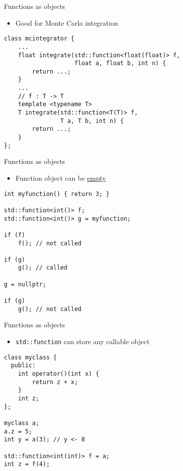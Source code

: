 \documentclass[10pt]{beamer}
\begin{document}
\begin{frame}[fragile,label={sec:orgdacb95a}]{Functions as objects}
 \begin{itemize}
\item Good for Monte Carlo integration
\end{itemize}

\begin{verbatim}
class mcintegrator {
    ...
    float integrate(std::function<float(float)> f,
                    float a, float b, int n) {
        return ...;
    }
    ...
    // f : T -> T
    template <typename T>
    T integrate(std::function<T(T)> f,
                T a, T b, int n) {
        return ...;
    }
};
\end{verbatim}
\end{frame}

\begin{frame}[fragile,label={sec:orgcf9fad0}]{Functions as objects}
 \begin{itemize}
\item Function object can be \uline{empty}
\end{itemize}

\begin{verbatim}
int myfunction() { return 3; }

std::function<int()> f;
std::function<int()> g = myfunction;

if (f)
    f(); // not called

if (g)
    g(); // called

g = nullptr;

if (g)
    g(); // not called
\end{verbatim}
\end{frame}

\begin{frame}[fragile,label={sec:org9cfc313}]{Functions as objects}
 \begin{itemize}
\item \texttt{std::function} can store any \alert{callable} object
\end{itemize}
\begin{verbatim}
class myclass {
  public:
    int operator()(int x) {
        return z + x;
    }
    int z;
};

myclass a;
a.z = 5;
int y = a(3); // y <- 8

std::function<int(int)> f = a;
int z = f(4);
\end{verbatim}
\end{frame}
\end{document}
